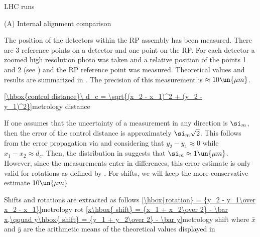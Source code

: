 \> LHC runs

(A) Internal alignment comparison

The position of the detectors within the RP assembly has been measured. There are 3 reference points on a detector and one point on the RP. For each detector a zoomed high resolution photo was taken and a relative position of the points 1 and 2 (see ) and the RP reference point was measured. Theoretical values and results are summarized in . The precision of this measurement is $\approx 10\un{\mu m}$.



\eqref{\hbox{control distance}\ d_c = \sqrt{(x_2 - x_1)^2 + (y_2 - y_1)^2}}{metrology distance}


If one assumes that the uncertainty of a measurement in any direction is $\si_m$, then the error of the control distance is approximately $\si_m \sqrt2$. This follows from the error propagation via  and considering that $y_2-y_1\approx 0$ while $x_1-x_2\approx d_c$. Then, the distribution in  suggests that $\si_m \approx 1\un{\mu m}$. However, since the measurements enter  in differences, this error estimate is only valid for rotations as defined by . For shifts, we will keep the more conservative estimate $10\un{\mu m}$

Shifts and rotations are extracted as follows
\eqref{\hbox{rotation} = {y_2 - y_1\over x_2 - x_1}}{metrology rot}
\eqref{x\hbox{ shift} = {x_1 + x_2\over 2} - \bar x,\qquad y\hbox{ shift} = {y_1 + y_2\over 2} - \bar y}{metrology shift}
where $\bar x$ and $\bar y$ are the arithmetic means of the theoretical values displayed in 

